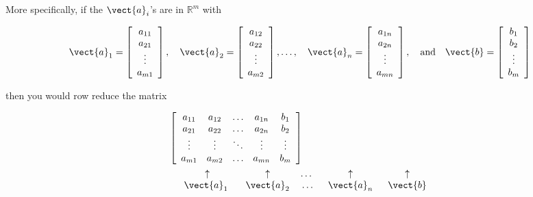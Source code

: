 More specifically, if the $\vect{a}_i$'s are in $\mathbb{R}^m$ with

\[
\vect{a}_1 = \left[\begin{array}{c}
a_{11} \\
a_{21} \\
\vdots \\
a_{m1}
\end{array}\right], \quad \vect{a}_2 = \left[\begin{array}{c}
a_{12} \\
a_{22} \\
\vdots \\
a_{m2}
\end{array}\right], \ldots, \quad \vect{a}_n = \left[\begin{array}{c}
a_{1n} \\
a_{2n} \\
\vdots \\
a_{mn}
\end{array}\right], \quad \text{and} \quad \vect{b} = \left[\begin{array}{c}
b_1 \\
b_2 \\
\vdots \\
b_m
\end{array}\right]
\]

then you would row reduce the matrix

\[
\begin{aligned}
& \left[\begin{array}{ccccc}
a_{11} & a_{12} & \ldots & a_{1n} & b_1 \\
a_{21} & a_{22} & \ldots & a_{2n} & b_2 \\
\vdots & \vdots & \ddots & \vdots & \vdots \\
a_{m1} & a_{m2} & \ldots & a_{mn} & b_m
\end{array}\right] \\
& \begin{array}{ccccc}
\hspace{0.5cm} \uparrow & \hspace{0.3cm} \uparrow & \hspace{0.0cm} \ldots & \hspace{0.2cm} \uparrow & \hspace{0.2cm} \uparrow \\
\hspace{0.4cm} \vect{a}_1 & \hspace{0.3cm} \vect{a}_2 & \hspace{0.1cm} \ldots & \hspace{0.2cm} \vect{a}_n & \hspace{0.2cm} \vect{b}
\end{array}
\end{aligned}
\]

